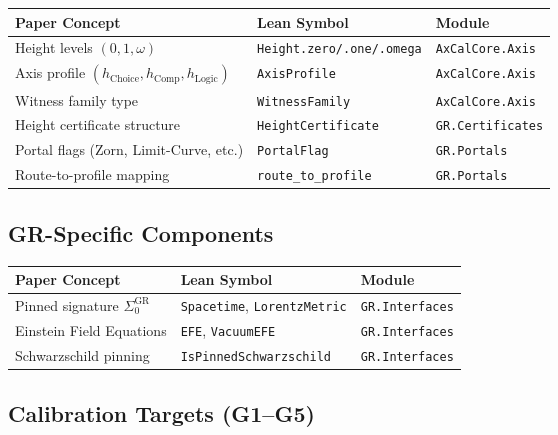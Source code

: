 \documentclass[11pt]{article}
\theoremstyle{definition}
\theoremstyle{remark}
\newcommand{\hChoice}{h_{\mathrm{Choice}}}    %
\newcommand{\hComp}{h_{\mathrm{Comp}}}        %
\newcommand{\hLogic}{h_{\mathrm{Logic}}}      %
\begin{document}
\begin{center}
\small
\begin{tabular}{|p{5cm}|p{5.5cm}|p{4cm}|}
\hline
\textbf{Paper Concept} & \textbf{Lean Symbol} & \textbf{Module} \\
\hline
Height levels $(0, 1, \omega)$ & \texttt{Height.zero/.one/.omega} & \texttt{AxCalCore.Axis} \\
\hline
Axis profile $(\hChoice, \hComp, \hLogic)$ & \texttt{AxisProfile} & \texttt{AxCalCore.Axis} \\
\hline
Witness family type & \texttt{WitnessFamily} & \texttt{AxCalCore.Axis} \\
\hline
Height certificate structure & \texttt{HeightCertificate} & \texttt{GR.Certificates} \\
\hline
Portal flags (Zorn, Limit-Curve, etc.) & \texttt{PortalFlag} & \texttt{GR.Portals} \\
\hline
Route-to-profile mapping & \texttt{route\_to\_profile} & \texttt{GR.Portals} \\
\hline
\end{tabular}
\end{center}

\subsection{GR-Specific Components}

\begin{center}
\small
\begin{tabular}{|p{5cm}|p{5.5cm}|p{4cm}|}
\hline
\textbf{Paper Concept} & \textbf{Lean Symbol} & \textbf{Module} \\
\hline
Pinned signature $\Sigma_0^{\mathrm{GR}}$ & \texttt{Spacetime}, \texttt{LorentzMetric} & \texttt{GR.Interfaces} \\
\hline
Einstein Field Equations & \texttt{EFE}, \texttt{VacuumEFE} & \texttt{GR.Interfaces} \\
\hline
Schwarzschild pinning & \texttt{IsPinnedSchwarzschild} & \texttt{GR.Interfaces} \\
\hline
\end{tabular}
\end{center}

\subsection{Calibration Targets (G1--G5)}
\end{document}
